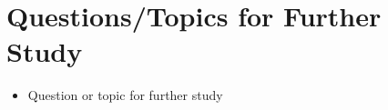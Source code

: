 \documentclass[12pt,a4paper]{article}
\begin{document}
\section{Questions/Topics for Further Study}
\begin{itemize}
  \item Question or topic for further study
\end{itemize}
\end{document}
